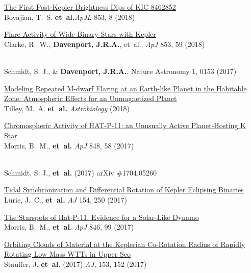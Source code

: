 \documentclass{article}
\begin{document}
\begin{llist}
\begin{etaremune}[leftmargin=10pt]
\item{\sc \href{https://arxiv.org/abs/1801.00732}{\color{blue}The First Post-Kepler Brightness Dips of KIC 8462852}}\\
Boyajian, T.~S. {\bf et~al.}{\em ApJL} 853, 8 (2018)


\item{\sc \href{https://arxiv.org/abs/1712.04570}{\color{blue}Flare Activity of Wide Binary Stars with Kepler}}\\
Clarke, R.~W., {\bf Davenport, J.R.A.}, et~al., {\em ApJ} 853, 59 (2018)


\item\href{https://www.nature.com/articles/s41550-017-0153}{\color{blue}{\sc Who asks questions at astronomy meetings?}}\\ 
Schmidt, S. J., \& {\bf Davenport, J.R.A.}, Nature Astronomy 1, 0153 (2017)

\item{\sc \href{https://arxiv.org/abs/1711.08484}{\color{blue} Modeling Repeated M-dwarf Flaring at an Earth-like Planet in the Habitable Zone: Atmospheric Effects for an Unmagnetized Planet}}\\
Tilley, M.~A. {\bf et~al.} {\em Astrobiology} (2018)

\item{\sc \href{https://arxiv.org/abs/1709.03913}{\color{blue} Chromospheric Activity of HAT-P-11: an Unusually Active Planet-Hosting K Star}}\\
Morris, B.~M., {\bf et~al.} {\em ApJ} 848, 58 (2017)

\item\href{https://arxiv.org/abs/1704.05260}{\color{blue}{\sc The Role of Gender in Asking Questions at Cool Stars 18 and 19}}\\ 
Schmidt, S. J., {\bf et~al.} (2017) arXiv \#1704.05260

\item{\sc \href{https://arxiv.org/abs/1710.07339}{\color{blue}Tidal Synchronization and Differential Rotation of Kepler Eclipsing Binaries}}\\ Lurie, J.~C., {\bf et~al.} {\em AJ} 154, 250 (2017)

\item{\sc \href{https://arxiv.org/abs/1708.02583}{\color{blue}The Starspots of Hat-P-11: Evidence for a Solar-Like Dynamo}} \\ Morris, B.~M., {\bf et~al.} {\em ApJ} 846, 99 (2017)

\item{\sc \href{https://arxiv.org/abs/1702.01797}{\color{blue}Orbiting Clouds of Material at the Keplerian Co-Rotation Radius of Rapidly Rotating Low Mass WTTs in Upper Sco}} \\
Stauffer, J. {\bf et~al.} (2017) {\em AJ}, 153, 152 (2017)


\end{etaremune}
\end{llist}
\end{document}
